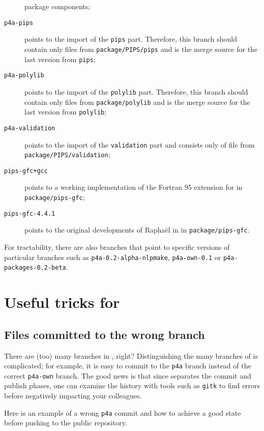 \documentclass[a4paper]{article}
\begin{document}
\begin{description}
  package components;
\item[\texttt{p4a-pips}] points to the import of the \Apips \texttt{pips}
  part. Therefore, this branch should contain only files from
  \texttt{package/PIPS/pips} and is the merge source for
  the last version from \texttt{pips};
\item[\texttt{p4a-polylib}] points to the import of the \Apips \texttt{polylib}
  part. Therefore, this branch should contain only files from
  \texttt{package/polylib} and is the merge source for
  the last version from \texttt{polylib};
\item[\texttt{p4a-validation}] points to the import of the \Apips
  \texttt{validation} part and consists only of file from
  \texttt{package/PIPS/validation};
\item[\texttt{pips-gfc+gcc}] points to a working \Apipsgfc implementation
  of the Fortran 95 extension for \Apips in \texttt{package/pips-gfc};
\item[\texttt{pips-gfc-4.4.1}] points to the original developments of
  Raphaël in \Agcc in \texttt{package/pips-gfc}.
\end{description}

For tractability, there are also branches that point
to specific versions of particular branches such as
\texttt{p4a-0.2-alpha-nlpmake}, \texttt{p4a-own-0.1} or
\texttt{p4a-packages-0.2-beta}.


\section{Useful \protect\Agit tricks for \protect\Apfa}
\label{sec:some-agit-tricks}

\subsection{Files committed to the wrong branch}
\label{sec:you-have-comited}

There are (too) many branches in \Apfa, right? Distinguishing the many
branches of \Apfa is complicated; for example, it is easy
to commit to the \texttt{p4a} branch instead of the correct
\texttt{p4a-own} branch. The good news is that since \Agit separates
the commit and publish phases, one can examine the history
with tools such as \texttt{gitk} to find errors before negatively
impacting your colleagues.

Here is an example of a wrong \texttt{p4a} commit and how to achieve a
good state before pushing to the public repository.
\end{document}
